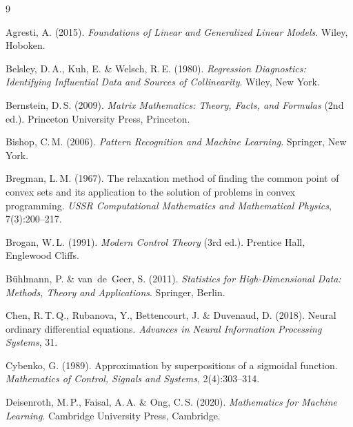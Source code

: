 ﻿\documentclass[12pt, a4paper]{article}
\theoremstyle{definition}
\theoremstyle{remark}
\begin{document}
\begin{thebibliography}{9}

Agresti, A. (2015).
\newblock \textit{Foundations of Linear and Generalized Linear Models}.
\newblock Wiley, Hoboken.

Belsley, D.\,A., Kuh, E. \& Welsch, R.\,E. (1980).
\newblock \textit{Regression Diagnostics: Identifying Influential Data and
  Sources of Collinearity}.
\newblock Wiley, New York.

Bernstein, D.\,S. (2009).
\newblock \textit{Matrix Mathematics: Theory, Facts, and Formulas} (2nd ed.).
\newblock Princeton University Press, Princeton.

Bishop, C.\,M. (2006).
\newblock \textit{Pattern Recognition and Machine Learning}.
\newblock Springer, New York.

Bregman, L.\,M. (1967).
\newblock The relaxation method of finding the common point of convex sets and
  its application to the solution of problems in convex programming.
\newblock \textit{USSR Computational Mathematics and Mathematical Physics},
  7(3):200--217.

Brogan, W.\,L. (1991).
\newblock \textit{Modern Control Theory} (3rd ed.).
\newblock Prentice Hall, Englewood Cliffs.

Bühlmann, P. \& van~de~Geer, S. (2011).
\newblock \textit{Statistics for High-Dimensional Data: Methods, Theory and
  Applications}.
\newblock Springer, Berlin.

Chen, R.\,T.\,Q., Rubanova, Y., Bettencourt, J. \& Duvenaud, D. (2018).
\newblock Neural ordinary differential equations.
\newblock \textit{Advances in Neural Information Processing Systems}, 31.

Cybenko, G. (1989).
\newblock Approximation by superpositions of a sigmoidal function.
\newblock \textit{Mathematics of Control, Signals and Systems}, 2(4):303--314.

Deisenroth, M.\,P., Faisal, A.\,A. \& Ong, C.\,S. (2020).
\newblock \textit{Mathematics for Machine Learning}.
\newblock Cambridge University Press, Cambridge.


\end{thebibliography}
\end{document}

